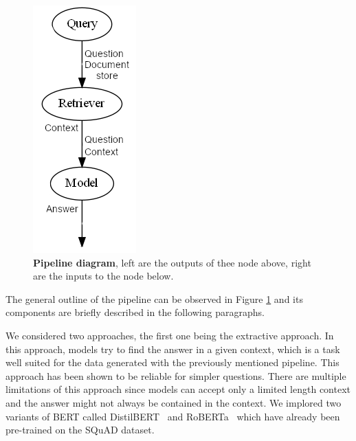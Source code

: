 \documentclass[fleqn,moreauthors,10pt]{ds_report}
\begin{document}
\begin{figure}[hbt]\centering
	\includegraphics[width=0.35\linewidth]{fig/pipeline.png}
	\caption{\textbf{Pipeline diagram}, left are the outputs of thee node above, right are the inputs to the node below.}
	\label{fig:pipeline}
\end{figure}

The general outline of the pipeline can be observed in Figure \ref{fig:pipeline} and its components are briefly described in the following paragraphs.

\noindent We considered two approaches, the first one being the extractive approach.
In this approach, models try to find the answer in a given context, which is a task well suited for the data generated with the previously mentioned pipeline.
This approach has been shown to be reliable for simpler questions.
There are multiple limitations of this approach since models can accept only a limited length context and the answer might not always be contained in the context.
We implored two variants of BERT called DistilBERT~\cite{sanh2019distilbert} and RoBERTa~\cite{liu2019roberta} which have already been pre-trained on the SQuAD dataset.
\end{document}
